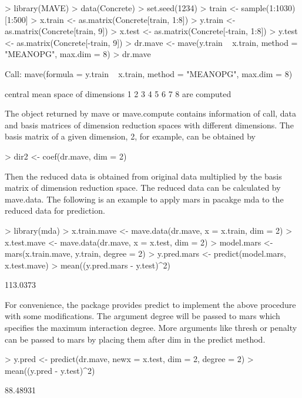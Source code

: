 \documentclass{article}
\newcommand{\pkg}[1]{{\fontseries{b}\selectfont #1}}
\newcommand{\code}[1]{\normalfont\ttfamily\hyphenchar\font=-1 #1}
\begin{document}
\begin{Schunk}
\begin{Sinput}
> library(MAVE)
> data(Concrete)
> set.seed(1234)
> train <- sample(1:1030)[1:500]
> x.train <- as.matrix(Concrete[train, 1:8])
> y.train <- as.matrix(Concrete[train, 9])
> x.test <- as.matrix(Concrete[-train, 1:8])
> y.test <- as.matrix(Concrete[-train, 9])
> dr.mave <- mave(y.train ~ x.train, method = "MEANOPG", max.dim = 8)
> dr.mave
\end{Sinput}
\begin{Soutput}
Call:
mave(formula = y.train ~ x.train, method = "MEANOPG", max.dim = 8)

central mean space  of dimensions  1 2 3 4 5 6 7 8  are computed
\end{Soutput}
\end{Schunk}
The object returned by \code{mave} or \code{mave.compute} contains information of call, data and basis matrices of dimension reduction spaces with different dimensions. The basis matrix of a given dimension, 2, for example, can be obtained by
\begin{Schunk}
\begin{Sinput}
> dir2 <- coef(dr.mave, dim = 2)
\end{Sinput}
\end{Schunk}
Then the reduced data is obtained from original data multiplied by the basis matrix of dimension reduction space. The reduced data can be calculated by \code{mave.data}. The following is an example to apply \code{mars} in pacakge \pkg{mda} to the reduced data for prediction.
\begin{Schunk}
\begin{Sinput}
> library(mda)
> x.train.mave <- mave.data(dr.mave, x = x.train, dim = 2)
> x.test.mave <- mave.data(dr.mave, x = x.test, dim = 2)
> model.mars <- mars(x.train.mave, y.train, degree = 2)
> y.pred.mars <- predict(model.mars, x.test.mave)
> mean((y.pred.mars - y.test)^2)
\end{Sinput}
\begin{Soutput}
[1] 113.0373
\end{Soutput}
\end{Schunk}
For convenience, the package provides \code{predict} to implement the above procedure with some modifications. The argument \code{degree} will be passed to \code{mars} which specifies the maximum interaction degree. More arguments like \code{thresh} or \code{penalty} can be passed to \code{mars} by placing them after \code{dim} in the \code{predict} method.
\begin{Schunk}
\begin{Sinput}
> y.pred <- predict(dr.mave, newx = x.test, dim = 2, degree = 2)
> mean((y.pred - y.test)^2)
\end{Sinput}
\begin{Soutput}
[1] 88.48931
\end{Soutput}
\end{Schunk}
\end{document}
